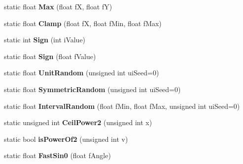\begin{DoxyCompactItemize}
\item 
static float {\bfseries Max} (float fX, float fY)\hypertarget{class_magnum_1_1_math_a681e5060e5b4c051829fbff70be5538d}{}\label{class_magnum_1_1_math_a681e5060e5b4c051829fbff70be5538d}

\item 
static float {\bfseries Clamp} (float fX, float f\+Min, float f\+Max)\hypertarget{class_magnum_1_1_math_a9f23512eee34b43497f4bbc8c4c9461e}{}\label{class_magnum_1_1_math_a9f23512eee34b43497f4bbc8c4c9461e}

\item 
static int {\bfseries Sign} (int i\+Value)\hypertarget{class_magnum_1_1_math_a9f79a598459a64f2d554f97a001c64b9}{}\label{class_magnum_1_1_math_a9f79a598459a64f2d554f97a001c64b9}

\item 
static float {\bfseries Sign} (float f\+Value)\hypertarget{class_magnum_1_1_math_acbc6791ccf58973ca745362514f62cc0}{}\label{class_magnum_1_1_math_acbc6791ccf58973ca745362514f62cc0}

\item 
static float {\bfseries Unit\+Random} (unsigned int ui\+Seed=0)\hypertarget{class_magnum_1_1_math_af3532885e292fb4a3540df0a6f914223}{}\label{class_magnum_1_1_math_af3532885e292fb4a3540df0a6f914223}

\item 
static float {\bfseries Symmetric\+Random} (unsigned int ui\+Seed=0)\hypertarget{class_magnum_1_1_math_a632172c32054a3ec4ff512535035be78}{}\label{class_magnum_1_1_math_a632172c32054a3ec4ff512535035be78}

\item 
static float {\bfseries Interval\+Random} (float f\+Min, float f\+Max, unsigned int ui\+Seed=0)\hypertarget{class_magnum_1_1_math_a623035316859e6d3512b9f8d36c5c080}{}\label{class_magnum_1_1_math_a623035316859e6d3512b9f8d36c5c080}

\item 
static unsigned int {\bfseries Ceil\+Power2} (unsigned int x)\hypertarget{class_magnum_1_1_math_a50e4c769c7d438c774572aa5890be41e}{}\label{class_magnum_1_1_math_a50e4c769c7d438c774572aa5890be41e}

\item 
static bool {\bfseries is\+Power\+Of2} (unsigned int v)\hypertarget{class_magnum_1_1_math_a72aeb693e4adb2dd466802812813028c}{}\label{class_magnum_1_1_math_a72aeb693e4adb2dd466802812813028c}

\item 
static float {\bfseries Fast\+Sin0} (float f\+Angle)\hypertarget{class_magnum_1_1_math_a82279b3781bd200961ede40ee5bab342}{}\label{class_magnum_1_1_math_a82279b3781bd200961ede40ee5bab342}


\end{DoxyCompactItemize}
